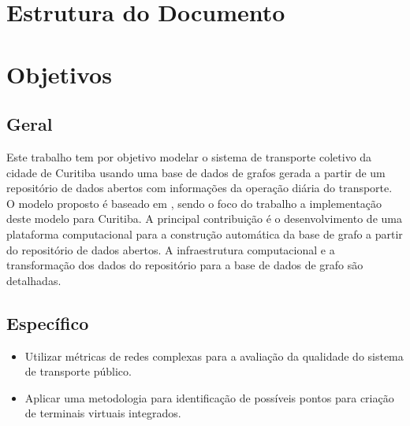 \section{Estrutura do Documento}
\label{sec:estrutura}



\section{Objetivos}
 
\subsection{Geral}


\textcolor{courb2020}{
Este trabalho tem por objetivo modelar o sistema de transporte coletivo da cidade de Curitiba usando uma base de dados de grafos gerada a partir de um repositório de dados abertos com informações da operação diária do transporte. O modelo proposto é baseado em \cite{wach:19}, sendo o foco do trabalho a implementação deste modelo para Curitiba. A principal contribuição é o desenvolvimento de uma plataforma computacional para a construção automática da base de grafo a partir do repositório de dados abertos. A infraestrutura computacional e a transformação dos dados do repositório para a base de dados de grafo são detalhadas. 
}

 \subsection{Específico}
 
 \begin{itemize}
 \item Utilizar métricas de redes complexas para a avaliação da qualidade do sistema de transporte público.
 
 \item Aplicar uma metodologia para identificação de possíveis pontos para criação de terminais virtuais integrados.
 \end{itemize}